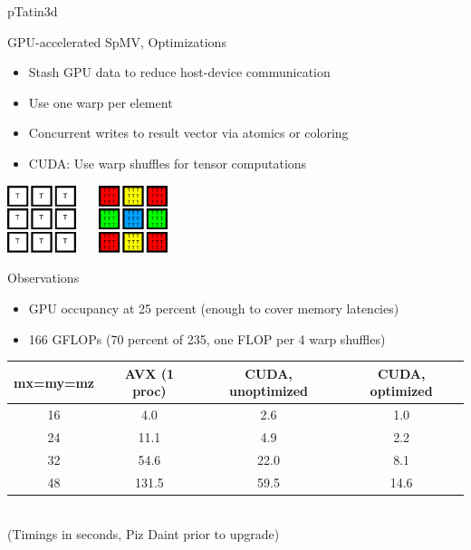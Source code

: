 \begin{frame}{pTatin3d}

  \begin{block}{GPU-accelerated SpMV, Optimizations}
  \begin{itemize}
   \item Stash GPU data to reduce host-device communication
   \item Use one warp per element
   \item Concurrent writes to result vector via atomics or coloring
   \item CUDA: Use warp shuffles for tensor computations
  \end{itemize}
  \begin{flushright} \vspace*{-2.5cm}
    \includegraphics[width=0.15\textwidth]{figures/threads-before} \ \ \ 
    \includegraphics[width=0.15\textwidth]{figures/threads-after}
  \end{flushright}
  \end{block}

  \begin{block}{Observations}
   \begin{itemize}
    \item GPU occupancy at 25 percent (enough to cover memory latencies)
    \item 166 GFLOPs (70 percent of 235, one FLOP per 4 warp shuffles)
   \end{itemize}
  \end{block}
  
\begin{center}
\begin{tabular}{|c|c|c|c|}
 \hline
 mx=my=mz        & AVX (1 proc) & CUDA, unoptimized & CUDA, optimized \\
 \hline
 \hline
 16              &  4.0         &  2.6  &  1.0  \\
 24              & 11.1         &  4.9  &  2.2  \\
 32              & 54.6         & 22.0  &  8.1  \\
 48              & 131.5        & 59.5  & 14.6  \\
 \hline
\end{tabular} \\
(Timings in seconds, Piz Daint prior to upgrade)
\end{center}
  
\end{frame}


